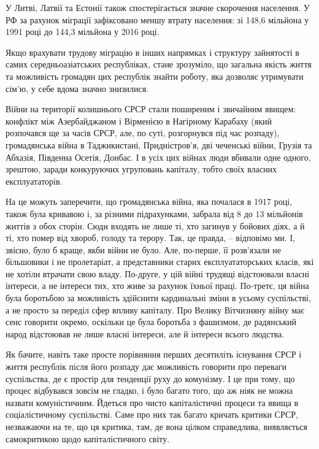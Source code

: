 \documentclass[../main]{subfiles}
\begin{document}
У Литві, Латвії та Естонії також спостерігається значне скорочення населення. У РФ за рахунок міграції зафіксовано меншу втрату населення: зі 148,6 мільйона у 1991 році до 144,3 мільйона у 2016 році.

Якщо врахувати трудову міграцію в інших напрямках і структуру зайнятості в самих середньоазіатських республіках, стане зрозуміло, що загальна якість життя та можливість громадян цих республік знайти роботу, яка дозволяє утримувати сім’ю, у себе вдома значно знизилися.

Війни на території колишнього СРСР стали поширеним і звичайним явищем: конфлікт між Азербайджаном і Вірменією в Нагірному Карабаху (який розпочався ще за часів СРСР, але, по суті, розгорнувся під час розпаду), громадянська війна в Таджикистані, Придністров’я, дві чеченські війни, Грузія та Абхазія, Південна Осетія, Донбас. І в усіх цих війнах люди вбивали одне одного, зрештою, заради конкуруючих угруповань капіталу, тобто своїх власних експлуататорів.

На це можуть заперечити, що громадянська війна, яка почалася в 1917 році, також була кривавою і, за різними підрахунками, забрала від 8 до 13 мільйонів життів з обох сторін. Сюди входять не лише ті, хто загинув у бойових діях, а й ті, хто помер від хвороб, голоду та терору. Так, це правда, – відповімо ми. І, звісно, було б краще, якби війни не було. Але, по-перше, її розв’язали не більшовики і не пролетаріат, а представники старих експлуататорських класів, які не хотіли втрачати свою владу. По-друге, у цій війні трудящі відстоювали власні інтереси, а не інтереси тих, хто живе за рахунок їхньої праці. По-третє, ця війна була боротьбою за можливість здійснити кардинальні зміни в усьому суспільстві, а не просто за переділ сфер впливу капіталу. Про Велику Вітчизняну війну має сенс говорити окремо, оскільки це була боротьба з фашизмом, де радянський народ відстоював не лише власні інтереси, але й інтереси всього людства.

Як бачите, навіть таке просте порівняння перших десятиліть існування СРСР і життя республік після його розпаду дає можливість говорити про переваги суспільства, де є простір для тенденції руху до комунізму. І це при тому, що процес відбувався зовсім не гладко, і було багато того, що аж ніяк не можна назвати комуністичним. Йдеться про чисто капіталістичні процеси та явища в соціалістичному суспільстві. Саме про них так багато кричать критики СРСР, незважаючи на те, що ця критика, там, де вона цілком справедлива, виявляється самокритикою щодо капіталістичного світу.
\end{document}
